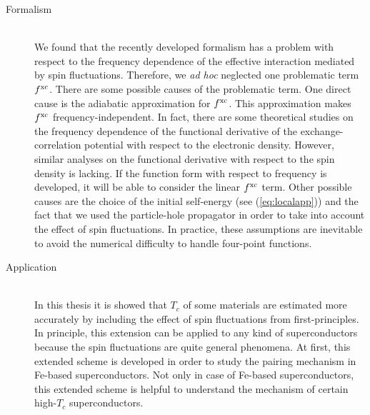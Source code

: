 \begin{description}
	\item[Formalism] \mbox{}\\
We found that the recently developed formalism has a problem with respect to the frequency dependence
of the effective interaction mediated by spin fluctuations. Therefore, we {\it ad hoc} neglected
one problematic term $f^{\rm xc}$. 
There are some possible causes of the problematic term. One direct cause is the adiabatic 
approximation for $f^{\rm xc}$. This approximation makes $f^{\rm xc}$ frequency-independent.
In fact, there are some theoretical studies on the frequency dependence of the functional derivative
of the exchange-correlation potential with respect to the electronic density\cite{Qian2002}.
However, similar analyses on the functional derivative with respect to the spin density is lacking.
If the function form with respect to frequency is developed, it will be able to consider the 
linear $f^{\rm xc}$ term.
Other possible causes are the choice of the initial self-energy (see (\ref{eq:localapp})) and 
the fact that we used the particle-hole propagator in order to take into account the effect of
spin fluctuations. In practice, these assumptions are inevitable to avoid the numerical difficulty 
to handle four-point functions.

\item[Application] \mbox{}\\
	In this thesis it is showed that $T_c$ of some materials are estimated more accurately by 
	including the effect of spin fluctuations from first-principles. 
	In principle, this extension can be applied to any 
	kind of superconductors because the spin fluctuations are quite general phenomena.
	At first, this extended scheme is developed in order to study the pairing mechanism in 
	Fe-based superconductors\cite{Essenberger2016, Lischner2015}. 
	Not only in case of Fe-based superconductors, this extended scheme is helpful to understand 
	the mechanism of certain high-$T_c$ superconductors.


\end{description}


